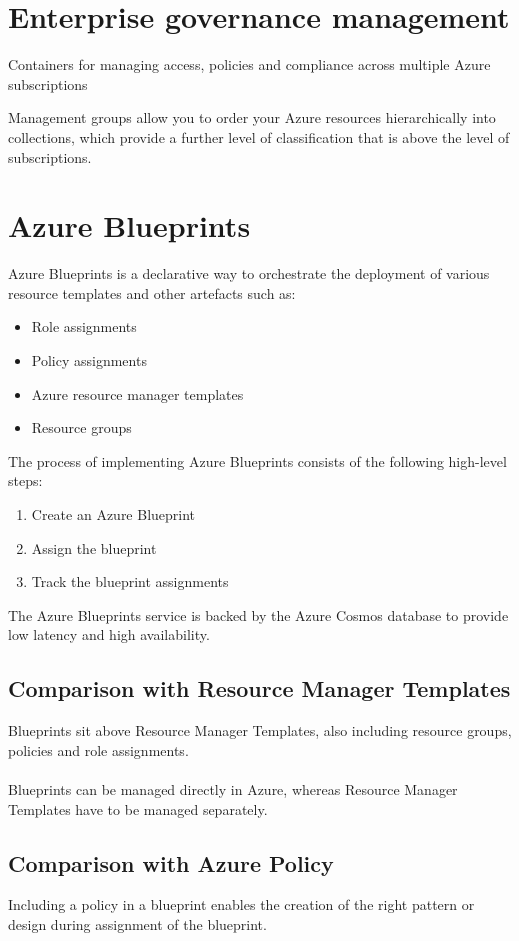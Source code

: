 \documentclass{article}[18pt]
\begin{document}
\section{Enterprise governance management}
\begin{definition}
	Containers for managing access, policies and compliance across multiple Azure subscriptions
\end{definition}
Management groups allow you to order your Azure resources hierarchically into collections, which provide a further level of classification that is above the level of subscriptions.
\section{Azure Blueprints}
Azure Blueprints is a declarative way to orchestrate the deployment of various resource templates and other artefacts such as:
\begin{itemize}
	\item Role assignments
	\item Policy assignments
	\item Azure resource manager templates
	\item Resource groups
\end{itemize}
The process of implementing Azure Blueprints consists of the following high-level steps:
\begin{enumerate}
	\item Create an Azure Blueprint
	\item Assign the blueprint
	\item Track the blueprint assignments
\end{enumerate}
The Azure Blueprints service is backed by the Azure Cosmos database to provide low latency and high availability.
\subsection{Comparison with Resource Manager Templates}
Blueprints sit above Resource Manager Templates, also including resource groups, policies and role assignments.\\
\\
Blueprints can be managed directly in Azure, whereas Resource Manager Templates have to be managed separately.
\subsection{Comparison with Azure Policy}
Including a policy in a blueprint enables the creation of the right pattern or design during assignment of the blueprint. 
\end{document}
